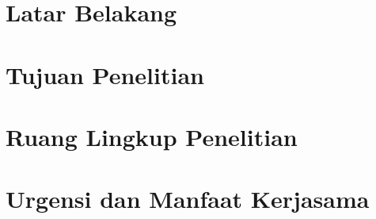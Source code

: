\documentclass[12pt, a4paper, onecolumn, oneside, final]{report}
\begin{document}
\clearpage
\listoffigures
%    
    \pagebreak
    

    \renewcommand{\thesection}{\Alph{section}.}
    \renewcommand{\thesubsection}{\thesection\arabic{subsection}}

    \clearpage
    \setcounter{page}{1}
    \pagestyle{plain}
    
    \justifying
    
    \section{Latar Belakang}
    

    \section{Tujuan Penelitian}
    

    \section{Ruang Lingkup Penelitian}
    

    \section{Urgensi dan Manfaat Kerjasama}
    
    
\end{document}
